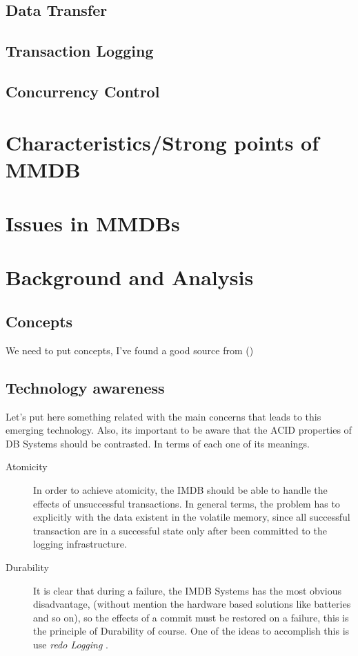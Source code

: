 \documentclass[10pt]{article} %
\begin{document}
\subsection{Data Transfer}
\subsection{Transaction Logging}
\subsection{Concurrency Control}
\section{Characteristics/Strong points of MMDB}
\section{Issues in MMDBs}



\section{Background and Analysis} 
\subsection{Concepts}
We need to put concepts, I've found a good source from ()

\subsection{Technology awareness}
Let's put here something related with the main concerns that leads to this emerging technology. Also, its important to be aware that the ACID properties of DB Systems should be contrasted. In terms of each one of its meanings.

\begin{description}
  \item[Atomicity] In order to achieve atomicity, the IMDB should be able to handle the effects of unsuccessful transactions. In general terms, the problem has to explicitly with the data existent in the volatile memory, since all successful transaction are in a successful state only after been committed to the logging infrastructure. %
  \item[Durability] It is clear that during a failure, the IMDB Systems has the most obvious disadvantage, (without mention the hardware based solutions like batteries and so on), so the effects of a commit must be restored on a failure, this is the principle of Durability of course. One of the ideas to accomplish this is use \emph{ redo Logging }. %
\end{description}
\end{document}
